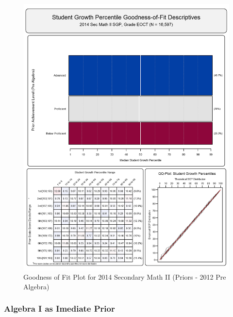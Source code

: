\documentclass[12pt]{article}
\begin{document}
\begin{figure}[htbp]
\centering
\includegraphics{../img/Goodness_of_Fit/SEC_MATH_II.2014/2014_SEC_MATH_II_EOCT;2012_PRE_ALGEBRA_EOCT.png}
\caption{Goodness of Fit Plot for 2014 Secondary Math II (Priors - 2012
Pre Algebra)}
\end{figure}

\clearpage 

\subsubsection{Algebra I as Imediate
Prior}\label{algebra-i-as-imediate-prior}
\end{document}
